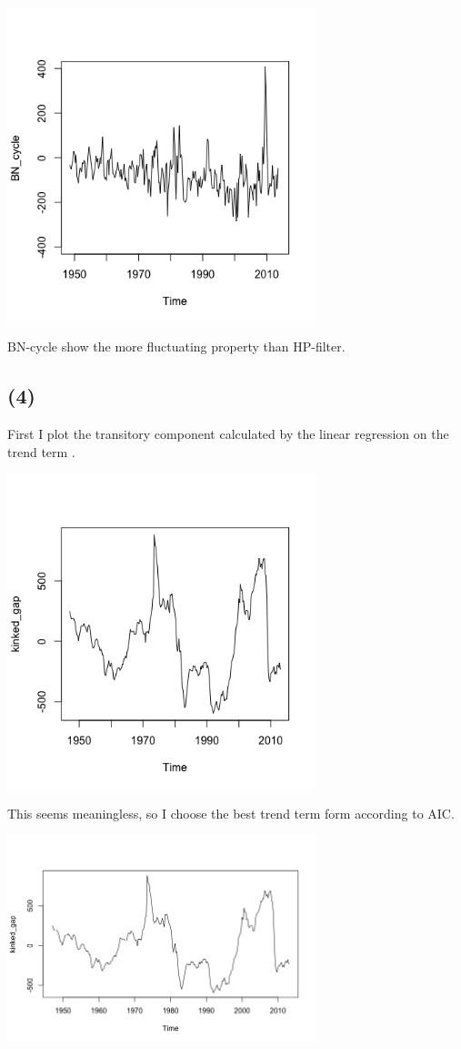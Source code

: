 \documentclass{article}
\begin{document}
   \includegraphics[width = 9cm]{BN_cycle.png}

BN-cycle show the more fluctuating property than HP-filter.
\subsection{(4)}
 First I plot the transitory component calculated by the linear regression on the trend term .
 
 \includegraphics[width = 9cm]{kinked_gap.png}
 
This seems meaningless, so I choose the best trend term form according to AIC.

 \includegraphics[width = 9cm]{kinked_gap2.png}
\end{document}
